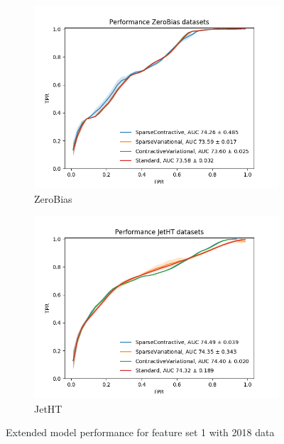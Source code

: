 \begin{figure}[h!]
\begin{subfigure}[b]{0.49\linewidth}
        \includegraphics[width=\linewidth]{images/reco/2018/feature_1/performance_ZeroBias_SparseContractiveSparseVariationalContractiveVariationalStandard.png}
        \caption{ZeroBias}
    \end{subfigure}
    \begin{subfigure}[b]{0.49\linewidth}
        \includegraphics[width=\linewidth]{images/reco/2018/feature_1/performance_JetHT_SparseContractiveSparseVariationalContractiveVariationalStandard.png}
        \caption{JetHT}
    \end{subfigure}
    \caption{Extended model performance for feature set 1 with 2018 data}
\label{fig:2018_f1_exteded_ae_performance}
\end{figure}


